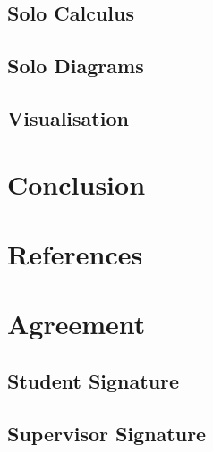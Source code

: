\documentclass{article}
\begin{document}
        \subsection{Solo Calculus}
        \subsection{Solo Diagrams}
        \subsection{Visualisation}

    \section{Conclusion}

    \section{References}
        

    \section{Agreement}
        \subsection{Student Signature}
            \vspace{1in}

        \subsection{Supervisor Signature}
            \vspace{1in}
\end{document}
